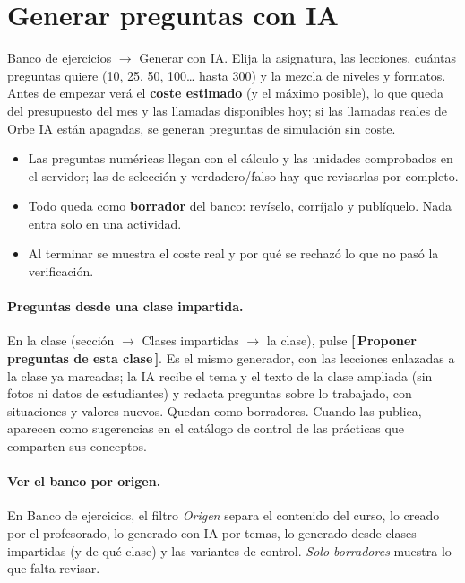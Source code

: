 \documentclass[11pt,a4paper,oneside]{book}
\newcommand{\boton}[1]{\textsf{\textbf{[\,#1\,]}}}
\newcommand{\ruta}[1]{\textsf{#1}}
\begin{document}
\section{Generar preguntas con IA}
\ruta{Banco de ejercicios $\rightarrow$ Generar con IA}. Elija la asignatura, las lecciones, cuántas preguntas quiere
(10, 25, 50, 100\ldots{} hasta 300) y la mezcla de niveles y formatos. Antes de empezar verá el \textbf{coste estimado}
(y el máximo posible), lo que queda del presupuesto del mes y las llamadas disponibles hoy; si las llamadas reales de
Orbe IA están apagadas, se generan preguntas de simulación sin coste.
\begin{itemize}
  \item Las preguntas numéricas llegan con el cálculo y las unidades comprobados en el servidor; las de selección y
        verdadero/falso hay que revisarlas por completo.
  \item Todo queda como \textbf{borrador} del banco: revíselo, corríjalo y publíquelo. Nada entra solo en una actividad.
  \item Al terminar se muestra el coste real y por qué se rechazó lo que no pasó la verificación.
\end{itemize}

\paragraph{Preguntas desde una clase impartida.} En la clase (\ruta{sección $\rightarrow$ Clases impartidas $\rightarrow$ la clase}),
pulse \boton{Proponer preguntas de esta clase}. Es el mismo generador, con las lecciones enlazadas a la clase ya marcadas; la IA
recibe el tema y el texto de la clase ampliada (sin fotos ni datos de estudiantes) y redacta preguntas sobre lo trabajado, con
situaciones y valores nuevos. Quedan como borradores. Cuando las publica, aparecen como sugerencias en el catálogo de control de
las prácticas que comparten sus conceptos.

\paragraph{Ver el banco por origen.} En \ruta{Banco de ejercicios}, el filtro \emph{Origen} separa el contenido del curso, lo
creado por el profesorado, lo generado con IA por temas, lo generado desde clases impartidas (y de qué clase) y las variantes de
control. \emph{Solo borradores} muestra lo que falta revisar.
\end{document}
